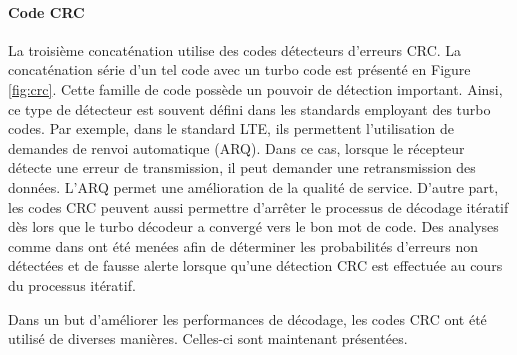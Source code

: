 \paragraph{Code CRC}
La troisième concaténation utilise des codes détecteurs d'erreurs CRC. La concaténation série d'un tel code avec un turbo code est présenté en Figure \ref{fig:crc}. Cette famille de code possède un pouvoir de détection important. Ainsi, ce type de détecteur est souvent défini dans les standards employant des turbo codes. Par exemple, dans le standard LTE, ils permettent l'utilisation de demandes de renvoi automatique (ARQ). Dans ce cas, lorsque le récepteur détecte une erreur de transmission, il peut demander une retransmission des données. L'ARQ permet une amélioration de la qualité de service. D'autre part, les codes CRC peuvent aussi permettre d'arrêter le processus de décodage itératif dès lors que le turbo décodeur a convergé vers le bon mot de code. Des analyses comme dans \cite{detectionCRC} ont été menées afin de déterminer les probabilités d'erreurs non détectées et de fausse alerte lorsque qu'une détection CRC est effectuée au cours du processus itératif. 

Dans un but d'améliorer les performances de décodage, les codes CRC ont été utilisé de diverses manières. Celles-ci sont maintenant présentées.

